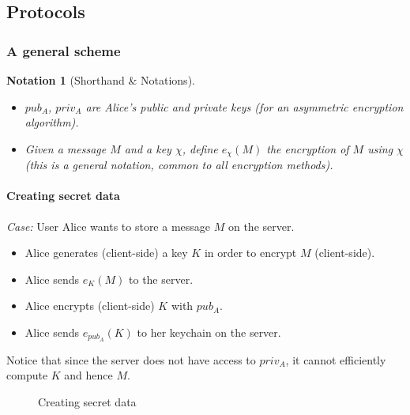 \documentclass[a4paper, english]{report}
\newtheorem{notation}{Notation}
\begin{document}
\subsection{Protocols}

\subsubsection{A general scheme}

\begin{notation}[Shorthand \& Notations]
\begin{itemize}
\item $pub_A$, $priv_A$ are Alice's public and private keys (for an asymmetric encryption algorithm).
\item Given a message $M$ and a key $\chi$, define $e_\chi(M)$ the encryption of $M$ using $\chi$ (this is a general notation, common to all encryption methods).
\end{itemize}
\end{notation}

\paragraph{Creating secret data}
\emph{Case:} User Alice wants to store a message $M$ on the server.
\begin{itemize}
\item Alice generates (client-side) a key $K$ in order to encrypt $M$ (client-side).
\item Alice sends $e_K(M)$ to the server.
\item Alice encrypts (client-side) $K$ with $pub_A$.
\item Alice sends $e_{pub_A}(K)$ to her keychain on the server.
\end{itemize}

Notice that since the server does not have access to $priv_A$, it cannot efficiently compute $K$ and hence $M$.

\begin{figure}[!h]
\centering
{}
\label{creating_secret_data}
\caption{Creating secret data}
\end{figure}
\end{document}
